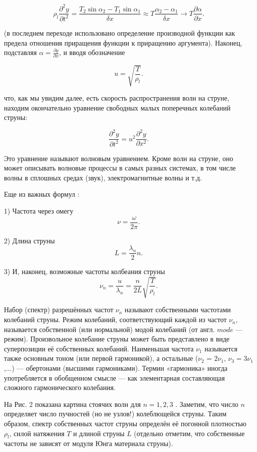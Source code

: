 \documentclass[a4paper,12pt]{article} %
\begin{document}
\[ \rho_l \frac{\partial^2{y}}{\partial{t^2}} = \frac{T_2 \sin{\alpha_2} - T_1 \sin{\alpha_1}}{\delta x} \approx T \frac{\alpha_2 - \alpha_1}{\delta x} \rightarrow T\frac{\partial{\alpha}}{\partial{x}}. \]

(в последнем переходе использовано определение производной функции как
предела отношения приращения функции к приращению аргумента). Наконец, подставляя $\alpha = \frac{\partial y}{\partial x}$, и вводя обозначение 


\[ u = \sqrt{\frac{T}{\rho_l}} .\]

что, как мы увидим далее, есть скорость распространения волн на струне,
находим окончательно уравнение свободных малых поперечных колебаний
струны:

\[  \frac{\partial^2 y}{\partial t^2} = u^2\frac{\partial^2 y}{\partial x^2} .\]

Это уравнение называют волновым уравнением. Кроме волн на струне, оно
может описывать волновые процессы в самых разных системах, в том числе
волны в сплошных средах (звук), электромагнитные волны и т.д.

Еще из важных формул :

1) Частота через омегу \[ \nu = \frac{\omega}{2\pi}.\]

2) Длина струны \[ L = \frac{\lambda_n}{2}n .\]

3) И, наконец, возможные частоты колбеания струны \[ \nu_n = \frac{u}{\lambda_n} = \frac{n}{2L} \sqrt{\frac{T}{\rho_l}} .\]

Набор (спектр) разрешённых частот $\nu_n$ называют собственными частотами
колебаний струны. Режим колебаний, соответствующий каждой из частот $\nu_n$,
называется собственной (или нормальной) модой колебаний (от англ. $mode$ —
режим). Произвольное колебание струны может быть представлено в виде суперпозиции её собственных колебаний. Наименьшая частота $\nu_1$ называется
также основным тоном (или первой гармоникой), а остальные ($\nu_2$ = $2 \nu_1$, $\nu_3 = 3\nu_1$,$\dots$) — обертонами (высшими гармониками). Термин «гармоника» иногда
употребляется в обобщенном смысле — как элементарная составляющая
сложного гармонического колебания.

На Рис. 2 показана картина стоячих волн для $n = 1, 2, 3$ . Заметим, что
число $n$ определяет число пучностей (но не узлов!) колеблющейся струны.
Таким образом, спектр собственных частот струны определён её погонной
плотностью $\rho_l$, силой натяжения $T$ и длиной струны $L$ (отдельно отметим, что
собственные частоты не зависят от модуля Юнга материала струны).
\end{document}
